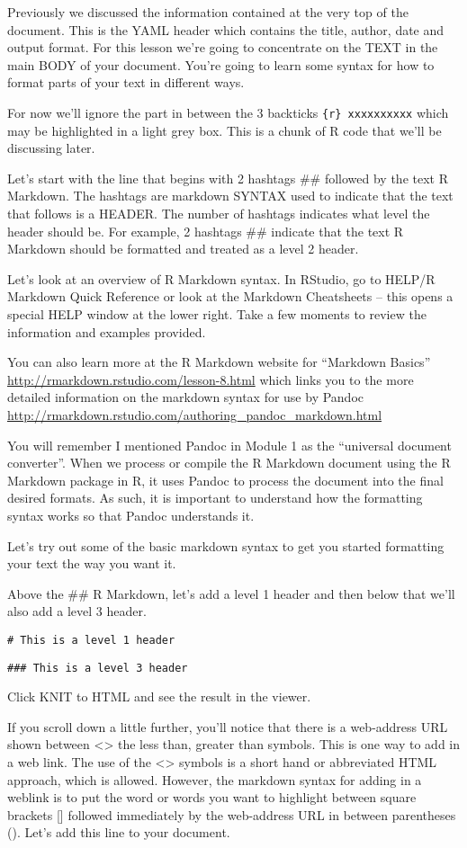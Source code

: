 \documentclass[
]{book}
\begin{document}
Previously we discussed the information contained at the very top of the document. This is the YAML header which contains the title, author, date and output format. For this lesson we're going to concentrate on the TEXT in the main BODY of your document. You're going to learn some syntax for how to format parts of your text in different ways.

For now we'll ignore the part in between the 3 backticks \texttt{\{r\}\ xxxxxxxxxx} which may be highlighted in a light grey box. This is a chunk of R code that we'll be discussing later.

Let's start with the line that begins with 2 hashtags \#\# followed by the text R Markdown. The hashtags are markdown SYNTAX used to indicate that the text that follows is a HEADER. The number of hashtags indicates what level the header should be. For example, 2 hashtags \#\# indicate that the text R Markdown should be formatted and treated as a level 2 header.

Let's look at an overview of R Markdown syntax. In RStudio, go to HELP/R Markdown Quick Reference or look at the Markdown Cheatsheets -- this opens a special HELP window at the lower right. Take a few moments to review the information and examples provided.

You can also learn more at the R Markdown website for ``Markdown Basics'' \url{http://rmarkdown.rstudio.com/lesson-8.html} which links you to the more detailed information on the markdown syntax for use by Pandoc \url{http://rmarkdown.rstudio.com/authoring_pandoc_markdown.html}

You will remember I mentioned Pandoc in Module 1 as the ``universal document converter''. When we process or compile the R Markdown document using the R Markdown package in R, it uses Pandoc to process the document into the final desired formats. As such, it is important to understand how the formatting syntax works so that Pandoc understands it.

Let's try out some of the basic markdown syntax to get you started formatting your text the way you want it.

Above the \#\# R Markdown, let's add a level 1 header and then below that we'll also add a level 3 header.

\texttt{\#\ This\ is\ a\ level\ 1\ header}

\texttt{\#\#\#\ This\ is\ a\ level\ 3\ header}

Click KNIT to HTML and see the result in the viewer.

If you scroll down a little further, you'll notice that there is a web-address URL shown between \textless\textgreater{} the less than, greater than symbols. This is one way to add in a web link. The use of the \textless\textgreater{} symbols is a short hand or abbreviated HTML approach, which is allowed. However, the markdown syntax for adding in a weblink is to put the word or words you want to highlight between square brackets {[}{]} followed immediately by the web-address URL in between parentheses (). Let's add this line to your document.
\end{document}
